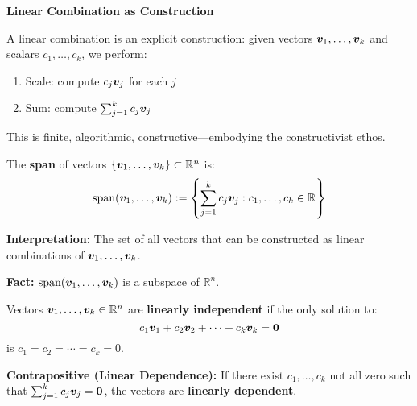 \begin{intuitionbox}
    \textbf{Linear Combination as Construction}

    A linear combination is an explicit construction: given vectors $\bm{v}_1,
        \ldots, \bm{v}_k$ and scalars $c_1, \ldots, c_k$, we perform:
    \begin{enumerate}
        \item Scale: compute $c_j\bm{v}_j$ for each $j$
        \item Sum: compute $\sum_{j=1}^{k} c_j\bm{v}_j$
    \end{enumerate}

    This is finite, algorithmic, constructive—embodying the constructivist ethos.
\end{intuitionbox}

\begin{definition}[Span]
    \label{def:span}
    The \textbf{span} of vectors $\{\bm{v}_1, \ldots, \bm{v}_k\} \subset \mathbb{R}^n$ is:
    \[
        \text{span}(\bm{v}_1, \ldots, \bm{v}_k) := \left\{ \sum_{j=1}^{k} c_j\bm{v}_j : c_1, \ldots, c_k \in \mathbb{R} \right\}
    \]

    \textbf{Interpretation:} The set of all vectors that can be constructed as linear combinations of $\bm{v}_1, \ldots, \bm{v}_k$.

    \textbf{Fact:} $\text{span}(\bm{v}_1, \ldots, \bm{v}_k)$ is a subspace of $\mathbb{R}^n$.
\end{definition}

\begin{definition}
    \label{def:linear-independence}
    Vectors $\bm{v}_1, \ldots, \bm{v}_k \in \mathbb{R}^n$ are \textbf{linearly independent} if the only solution to:
    \[
        c_1\bm{v}_1 + c_2\bm{v}_2 + \cdots + c_k\bm{v}_k = \bm{0}
    \]
    is $c_1 = c_2 = \cdots = c_k = 0$.

    \textbf{Contrapositive (Linear Dependence):} If there exist $c_1, \ldots, c_k$ not all zero such that $\sum_{j=1}^{k} c_j\bm{v}_j = \bm{0}$, the vectors are \textbf{linearly dependent}.
\end{definition}

